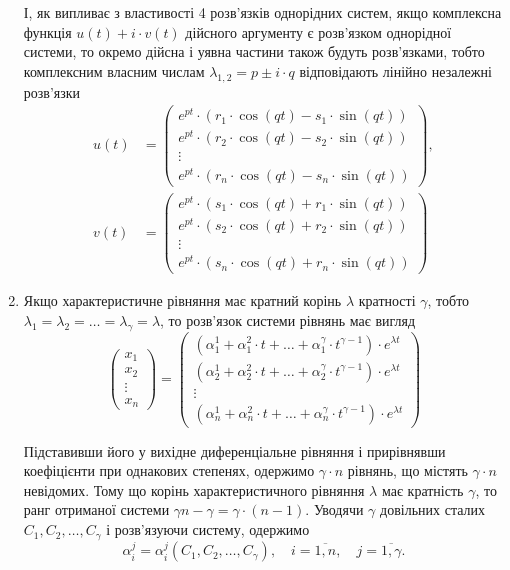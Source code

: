 \begin{enumerate}
І, як випливає з властивості 4 розв’язків однорідних систем, якщо комплексна функція $u(t) + i \cdot v(t)$ дійсного аргументу є розв’язком однорідної системи, то окремо дійсна і уявна частини також будуть розв’язками, тобто комплексним власним числам $\lambda_{1,2} = p \pm i \cdot q$  відповідають лінійно незалежні розв’язки
\begin{align*}
	u(t) &= \begin{pmatrix} e^{p t} \cdot (r_1 \cdot \cos (qt) - s_1 \cdot \sin(qt)) \\ e^{pt} \cdot (r_2 \cdot \cos (qt) - s_2 \cdot \sin(qt)) \\ \vdots \\ e^{pt} \cdot (r_n \cdot \cos (qt) - s_n \cdot \sin(qt)) \end{pmatrix}, \\
	v(t) &= \begin{pmatrix} e^{p t} \cdot (s_1 \cdot \cos (qt) + r_1 \cdot \sin(qt)) \\ e^{pt} \cdot (s_2 \cdot \cos (qt) + r_2 \cdot \sin(qt)) \\ \vdots \\ e^{pt} \cdot (s_n \cdot \cos (qt) + r_n \cdot \sin(qt)) \end{pmatrix}
\end{align*}

\item Якщо характеристичне рівняння має кратний корінь $\lambda$ кратності $\gamma$, тобто $\lambda_1 = \lambda_2 = \ldots = \lambda_\gamma = \lambda$, то розв’язок системи рівнянь має вигляд
\begin{equation*}
	\begin{pmatrix} x_1 \\ x_2 \\ \vdots \\ x_n \end{pmatrix} = \begin{pmatrix} \left(\alpha_1^1 + \alpha_1^2 \cdot t + \ldots + \alpha_1^\gamma \cdot t^{\gamma - 1}\right) \cdot e^{\lambda t} \\ \left(\alpha_2^1 + \alpha_2^2 \cdot t + \ldots + \alpha_2^\gamma \cdot t^{\gamma - 1}\right) \cdot e^{\lambda t} \\ \vdots \\ \left(\alpha_n^1 + \alpha_n^2 \cdot t + \ldots + \alpha_n^\gamma \cdot t^{\gamma - 1}\right) \cdot e^{\lambda t} \end{pmatrix}
\end{equation*}

Підставивши його у вихідне диференціальне рівняння і прирівнявши коефіцієнти при однакових степенях, одержимо $\gamma \cdot n$ рівнянь, що містять $\gamma \cdot n$ невідомих. Тому що корінь характеристичного рівняння $\lambda$ має кратність $\gamma$, то ранг отриманої системи $\gamma n - \gamma = \gamma \cdot (n - 1)$. Уводячи $\gamma$ довільних сталих $C_1, C_2, \ldots, C_\gamma$ і розв’язуючи систему, одержимо
\begin{equation*}
	\alpha_i^j = \alpha_i^j(C_1, C_2, \ldots, C_\gamma), \quad i = \overline{1, n}, \quad j = \overline{1, \gamma}.
\end{equation*}
\end{enumerate}